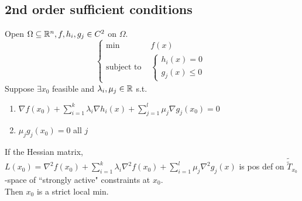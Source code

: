 \documentclass[11pt]{article}
\begin{document}
\subsection{2nd order sufficient conditions}
Open $\Omega \subseteq \mathbb{R}^n, f, h_i, g_j \in C^2$ on $\Omega$. \\
$$\begin{cases}
	\min &f(x) \\
	\text{subject to }&\begin{cases}h_i(x) = 0 \\
	g_j(x) \leq 0 \end{cases}
\end{cases}$$
Suppose $\exists x_0$ feasible and $\lambda_i, \mu_j \in \mathbb{R}$ s.t. 
\begin{enumerate}
	\item $\nabla f(x_0) + \sum_{i=1}^k \lambda_i \nabla h_i(x) + \sum_{j=1}^l \mu_j \nabla g_j(x_0) = 0$
	\item $\mu_j g_j(x_0) =0$ all $j$
\end{enumerate}
If the Hessian matrix, $L(x_0) = \nabla^2 f(x_0) + \sum_{i=1}^k \lambda_i \nabla^2 f(x_0) + \sum_{i=1}^l \mu_j \nabla^2 g_j(x)$ is pos def on $\tilde{\tilde{T}}_{x_0}$-space of ``strongly active" constraints at $x_0$. \\
Then $x_0$ is a strict local min. \\
\end{document}
